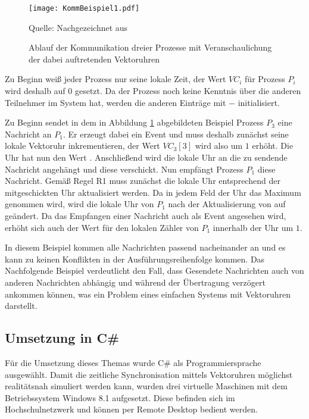 \begin{figure}[ht]
	\centering
	\texttt{[image: KommBeispiel1.pdf]}
	\caption[Beispiel einer Kommunikation]{Ablauf der Kommunikation dreier Prozesse mit Veranschaulichung der dabei auftretenden Vektoruhren}
	Quelle: Nachgezeichnet aus \cite{Baldoni:2002:FDC:1435723.1437765}
\label{figure:kommBeispiel1}
\end{figure}
\FloatBarrier

Zu Beginn weiß jeder Prozess nur seine lokale Zeit, der Wert $VC_i$ für Prozess $P_i$ wird deshalb auf $0$ gesetzt. Da der Prozess noch keine Kenntnis über die anderen Teilnehmer im System hat, werden die anderen Einträge mit \glqq$-$\glqq{} initialisiert.

Zu Beginn sendet in dem in Abbildung \ref{figure:kommBeispiel1} abgebildeten Beispiel Prozess $P_3$ eine Nachricht an $P_1$. Er erzeugt dabei ein Event und muss deshalb zunächst seine lokale Vektoruhr inkrementieren, der Wert $VC_3[3]$ wird also um $1$ erhöht. Die Uhr hat nun den Wert . Anschließend wird die lokale Uhr an die zu sendende Nachricht angehängt und diese verschickt.
Nun empfängt Prozess $P_1$ diese Nachricht. Gemäß Regel R1 muss zunächst die lokale Uhr entsprechend der mitgeschickten Uhr aktualisiert werden. Da in jedem Feld der Uhr das Maximum genommen wird, wird die lokale Uhr von $P_1$ nach der Aktualisierung von  auf  geändert. Da das Empfangen einer Nachricht auch als Event angesehen wird, erhöht sich auch der Wert für den lokalen Zähler von $P_1$ innerhalb der Uhr um $1$.

In diesem Beispiel kommen alle Nachrichten passend nacheinander an und es kann zu keinen Konflikten in der Ausführungsreihenfolge kommen. Das Nachfolgende Beispiel verdeutlicht den Fall, dass Gesendete Nachrichten auch von anderen Nachrichten abhängig und während der Übertragung verzögert ankommen können, was ein Problem eines einfachen Systems mit Vektoruhren darstellt.




\subsection{Umsetzung in C\#}
Für die Umsetzung dieses Themas wurde C\# als Programmiersprache ausgewählt. Damit die zeitliche Synchronisation mittels Vektoruhren möglichst realitätsnah simuliert werden kann, wurden drei virtuelle Maschinen mit dem Betriebssystem Windows 8.1 aufgesetzt. Diese befinden sich im Hochschulnetzwerk und können per Remote Desktop bedient werden.

